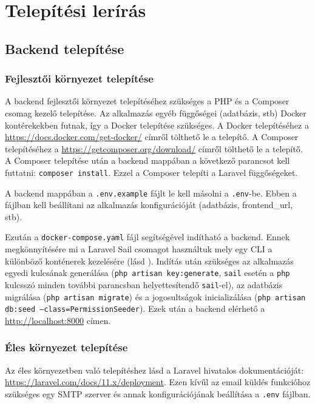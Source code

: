 \section{Telepítési lerírás}
\label{sec:installation}

\subsection{Backend telepítése}

\subsubsection{Fejlesztői környezet telepítése}

A backend fejlesztői környezet telepítéséhez szükséges a PHP és a Composer csomag kezelő telepítése. Az alkalmazás egyéb függőségei (adatbázis, stb) Docker kontérekekben futnak, így a Docker telepítése szükséges. A Docker telepítéséhez a \url{https://docs.docker.com/get-docker/} címről tölthető le a telepítő. A Composer telepítéséhez a \url{https://getcomposer.org/download/} címről tölthető le a telepítő. A Composer telepítése után a backend mappában a következő parancsot kell futtatni: \texttt{composer install}. Ezzel a Composer telepíti a Laravel függőségeket. 

A backend mappában a \texttt{.env.example} fájlt le kell másolni a \texttt{.env}-be. Ebben a fájlban kell beállítani az alkalmazás konfigurációját (adatbázis, frontend\_url, stb).

Ezután a \texttt{docker-compose.yaml} fájl segítségével indítható a backend. Ennek megkönnyítésére mi a Laravel Sail csomagot használtuk mely egy CLI a különböző konténerek kezelésére (lásd \cite{LaravelSail}). Indítás után szükséges az alkalmazás egyedi kulcsának generálása (\texttt{php artisan key:generate}, \texttt{sail} esetén a \texttt{php} kulcsszó minden további parancsban helyettesítendő \texttt{sail}-el), az adatbázis migrálása (\texttt{php artisan migrate}) és a jogosultságok inicializálása (\texttt{php artisan db:seed --class=PermissionSeeder}). Ezek után a backend elérhető a \url{http://localhost:8000} címen.

\subsubsection{Éles környezet telepítése}
Az éles környezetben való telepítéshez lásd a Laravel hivatalos dokumentációját: \url{https://laravel.com/docs/11.x/deployment}. Ezen kívűl az email küldés funkcióhoz szükséges egy SMTP szerver és annak konfigurációjának beállítása a \texttt{.env} fájlban.



